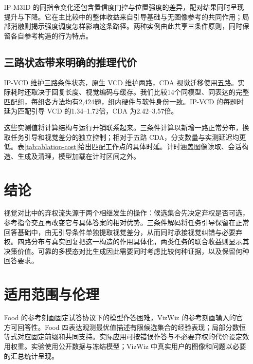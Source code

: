 \documentclass[11pt,twocolumn,a4paper]{article}
\renewcommand{\baselinestretch}{1.10}
\begin{document}
IP-M3ID 的同指令变化还包含置信度门控与位置强度的差异，配对结果同时呈现提升与下降。它在主比较中的整体收益来自引导基础与无图像参考的共同作用；局部消融则揭示强度调度怎样影响这条路径。两种实例由此共享三条件原则，同时保留各自参考构造的行为特点。

\subsection{三路状态带来明确的推理代价}
IP-VCD 维护三路条件状态，原生 VCD 维护两路，CDA 视觉迁移使用五路。实际耗时还取决于回复长度、视觉编码与缓存。我们比较14个同模型、同表达的完整匹配组，每组各方法均有2,424题，组内硬件与软件身份一致。IP-VCD 的每题时延为匹配引导 VCD 的1.34--1.72倍，CDA 为2.42--3.57倍。

这些实测值将计算结构与运行开销联系起来。三条件计算以新增一路正常分布，换取任务引导和视觉差分的独立控制；相对于五路 CDA，分支数量与实测延迟均更低。表\ref{tab:ablation-cost}给出匹配工作点的具体时延。计时涵盖图像读取、会话构造、生成及清理，模型加载在计时区间之外。

\newpage
\section{结论}
视觉对比中的弃权流失源于两个相继发生的操作：候选集合先决定弃权是否可选，参考指令交互再改变它与具体答案的相对优势。三条件解码将任务引导保留在正常回答基础中，由无引导条件单独提取视觉差分，从而同时承接视觉纠错与必要弃权。四路分布与真实回复把这一构造的作用具体化，两类任务的联合收益则显示其决策价值。可靠的多模态对比生成因此需要同时考虑比较何种证据，以及保留何种回答要求。

\section*{适用范围与伦理}
Food 的参考刻画固定试答协议下的模型作答困难，VizWiz 的参考刻画输入的官方可回答性。Food 四表达观测最优值描述有限候选集合的经验表现；局部分数恒等式对应固定前缀和共同支持。实际应用可按错误作答与不必要弃权的代价设定效用权重。实验使用公开数据与冻结模型；VizWiz 中真实用户的图像和问题以必要的汇总统计呈现。

\clearpage\nobalance
\small\setlength{\bibsep}{2pt}
\clearpage\onecolumn\renewcommand{\baselinestretch}{1.08}\normalsize
\appendix
{}
\end{document}
